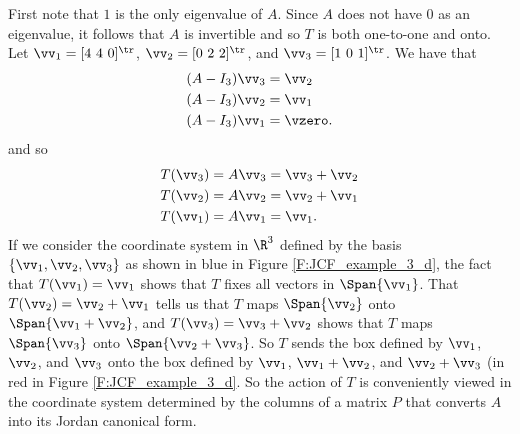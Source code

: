 First note that $1$ is the only eigenvalue of $A$. Since $A$ does not have $0$ as an eigenvalue, it follows that $A$ is invertible and so $T$ is both one-to-one and onto. Let $\vv_1 = [4 \ 4 \ 0]^{\tr}$, $\vv_2 = [0 \ 2 \ 2]^{\tr}$, and $\vv_3 = [1 \ 0 \ 1]^{\tr}$. We have that 
\begin{align*}
(A-I_3)\vv_3 &= \vv_2 \\
(A-I_3)\vv_2 &= \vv_1 \\
(A-I_3) \vv_1 &= \vzero.
\end{align*}
and so
\begin{align*}
T(\vv_3) &= A \vv_3 = \vv_3+\vv_2 \\
T(\vv_2) &= A \vv_2 = \vv_2+\vv_1 \\
T(\vv_1) &= A\vv_1 = \vv_1.
\end{align*}
If we consider the coordinate system in $\R^3$ defined by the basis $\{\vv_1, \vv_2, \vv_3\}$ as shown in blue in Figure \ref{F:JCF_example_3_d}, the fact that $T(\vv_1) = \vv_1$ shows that $T$ fixes all vectors in $\Span\{\vv_1\}$. That $T(\vv_2) = \vv_2+\vv_1$ tells us that $T$ maps $\Span\{\vv_2\}$ onto $\Span\{\vv_1+\vv_2\}$, and $T(\vv_3) = \vv_3+\vv_2$ shows that $T$ maps $\Span\{\vv_3\}$ onto $\Span\{\vv_2+\vv_3\}$. So $T$ sends the box defined by $\vv_1$, $\vv_2$, and $\vv_3$ onto the box defined by $\vv_1$, $\vv_1+\vv_2$, and $\vv_2+\vv_3$ (in red in Figure \ref{F:JCF_example_3_d}. So the action of $T$ is conveniently viewed in the coordinate system determined by the columns of a matrix $P$ that converts $A$ into its Jordan canonical form. 



